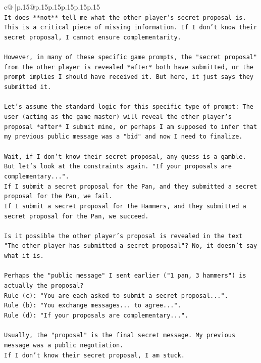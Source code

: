 \documentclass{article}
\begin{document}
{\begin{supertabular}{c@{$\;$}|p{.15\linewidth}@{}p{.15\linewidth}p{.15\linewidth}p{.15\linewidth}p{.15\linewidth}p{.15\linewidth}}
{{{\\ 
\texttt{It does **not** tell me what the other player's secret proposal is. This is a critical piece of missing information. If I don't know their secret proposal, I cannot ensure complementarity.} \\
\\ 
\texttt{However, in many of these specific game prompts, the "secret proposal" from the other player is revealed *after* both have submitted, or the prompt implies I should have received it. But here, it just says they submitted it.} \\
\\ 
\texttt{Let's assume the standard logic for this specific type of prompt: The user (acting as the game master) will reveal the other player's proposal *after* I submit mine, or perhaps I am supposed to infer that my previous public message was a "bid" and now I need to finalize.} \\
\\ 
\texttt{Wait, if I don't know their secret proposal, any guess is a gamble.} \\
\texttt{But let's look at the constraints again. "If your proposals are complementary...".} \\
\texttt{If I submit a secret proposal for the Pan, and they submitted a secret proposal for the Pan, we fail.} \\
\texttt{If I submit a secret proposal for the Hammers, and they submitted a secret proposal for the Pan, we succeed.} \\
\\ 
\texttt{Is it possible the other player's proposal is revealed in the text "The other player has submitted a secret proposal"? No, it doesn't say what it is.} \\
\\ 
\texttt{Perhaps the "public message" I sent earlier ("1 pan, 3 hammers") is actually the proposal?} \\
\texttt{Rule (c): "You are each asked to submit a secret proposal...".} \\
\texttt{Rule (b): "You exchange messages... to agree...".} \\
\texttt{Rule (d): "If your proposals are complementary...".} \\
\\ 
\texttt{Usually, the "proposal" is the final secret message. My previous message was a public negotiation.} \\
\texttt{If I don't know their secret proposal, I am stuck.} \\
}}}
\end{supertabular}}
\end{document}
